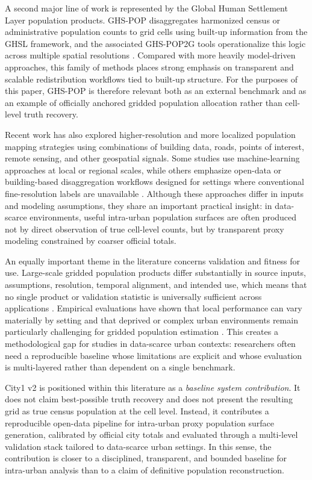 A second major line of work is represented by the Global Human Settlement Layer population products. GHS-POP disaggregates harmonized census or administrative population counts to grid cells using built-up information from the GHSL framework, and the associated GHS-POP2G tools operationalize this logic across multiple spatial resolutions \cite{Freire2016,GHSL2023,GHSPOP2G2020}. Compared with more heavily model-driven approaches, this family of methods places strong emphasis on transparent and scalable redistribution workflows tied to built-up structure. For the purposes of this paper, GHS-POP is therefore relevant both as an external benchmark and as an example of officially anchored gridded population allocation rather than cell-level truth recovery.

Recent work has also explored higher-resolution and more localized population mapping strategies using combinations of building data, roads, points of interest, remote sensing, and other geospatial signals. Some studies use machine-learning approaches at local or regional scales, while others emphasize open-data or building-based disaggregation workflows designed for settings where conventional fine-resolution labels are unavailable \cite{Qiu2020,Pirowski2024,Popcorn2024}. Although these approaches differ in inputs and modeling assumptions, they share an important practical insight: in data-scarce environments, useful intra-urban population surfaces are often produced not by direct observation of true cell-level counts, but by transparent proxy modeling constrained by coarser official totals.

An equally important theme in the literature concerns validation and fitness for use. Large-scale gridded population products differ substantially in source inputs, assumptions, resolution, temporal alignment, and intended use, which means that no single product or validation statistic is universally sufficient across applications \cite{Leyk2019}. Empirical evaluations have shown that local performance can vary materially by setting and that deprived or complex urban environments remain particularly challenging for gridded population estimation \cite{Thomson2021,Yin2021}. This creates a methodological gap for studies in data-scarce urban contexts: researchers often need a reproducible baseline whose limitations are explicit and whose evaluation is multi-layered rather than dependent on a single benchmark.

City1 v2 is positioned within this literature as a \emph{baseline system contribution}. It does not claim best-possible truth recovery and does not present the resulting grid as true census population at the cell level. Instead, it contributes a reproducible open-data pipeline for intra-urban proxy population surface generation, calibrated by official city totals and evaluated through a multi-level validation stack tailored to data-scarce urban settings. In this sense, the contribution is closer to a disciplined, transparent, and bounded baseline for intra-urban analysis than to a claim of definitive population reconstruction.
